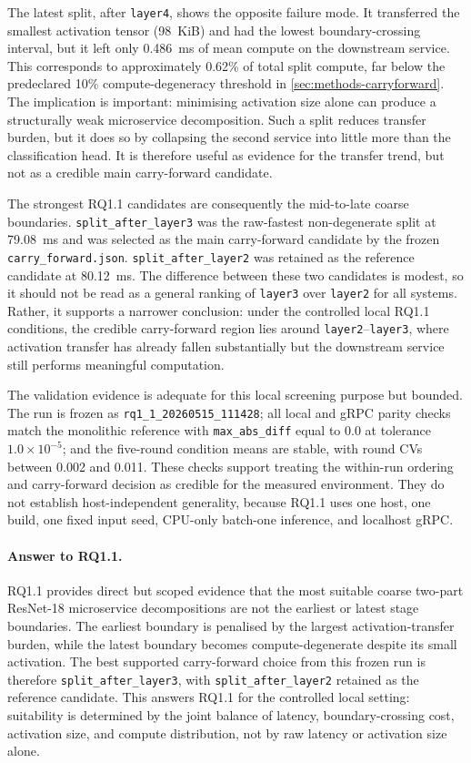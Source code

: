 The latest split, after \texttt{layer4}, shows the opposite failure mode.
It transferred the smallest activation tensor (98~KiB) and had the lowest
boundary-crossing interval, but it left only 0.486~ms of mean compute on
the downstream service. This corresponds to approximately 0.62\% of total
split compute, far below the predeclared 10\% compute-degeneracy
threshold in \cref{sec:methods-carryforward}. The implication is important:
minimising activation size alone can produce a structurally weak
microservice decomposition. Such a split reduces transfer burden, but it
does so by collapsing the second service into little more than the
classification head. It is therefore useful as evidence for the transfer
trend, but not as a credible main carry-forward candidate.

The strongest RQ1.1 candidates are consequently the mid-to-late coarse
boundaries. \texttt{split\_after\_layer3} was the raw-fastest
non-degenerate split at 79.08~ms and was selected as the main
carry-forward candidate by the frozen \texttt{carry\_forward.json}.
\texttt{split\_after\_layer2} was retained as the reference candidate at
80.12~ms. The difference between these two candidates is modest, so it
should not be read as a general ranking of \texttt{layer3} over
\texttt{layer2} for all systems. Rather, it supports a narrower conclusion:
under the controlled local RQ1.1 conditions, the credible carry-forward
region lies around \texttt{layer2}--\texttt{layer3}, where activation
transfer has already fallen substantially but the downstream service still
performs meaningful computation.

The validation evidence is adequate for this local screening purpose but
bounded. The run is frozen as \texttt{rq1\_1\_20260515\_111428}; all local
and gRPC parity checks match the monolithic reference with
\texttt{max\_abs\_diff} equal to 0.0 at tolerance $1.0\times10^{-5}$; and
the five-round condition means are stable, with round CVs between 0.002
and 0.011. These checks support treating the within-run ordering and
carry-forward decision as credible for the measured environment. They do
not establish host-independent generality, because RQ1.1 uses one host,
one build, one fixed input seed, CPU-only batch-one inference, and
localhost gRPC.

\paragraph{Answer to RQ1.1.}
RQ1.1 provides direct but scoped evidence that the most suitable coarse
two-part ResNet-18 microservice decompositions are not the earliest or
latest stage boundaries. The earliest boundary is penalised by the largest
activation-transfer burden, while the latest boundary becomes
compute-degenerate despite its small activation. The best supported
carry-forward choice from this frozen run is therefore
\texttt{split\_after\_layer3}, with \texttt{split\_after\_layer2} retained
as the reference candidate. This answers RQ1.1 for the controlled local
setting: suitability is determined by the joint balance of latency,
boundary-crossing cost, activation size, and compute distribution, not by
raw latency or activation size alone.

